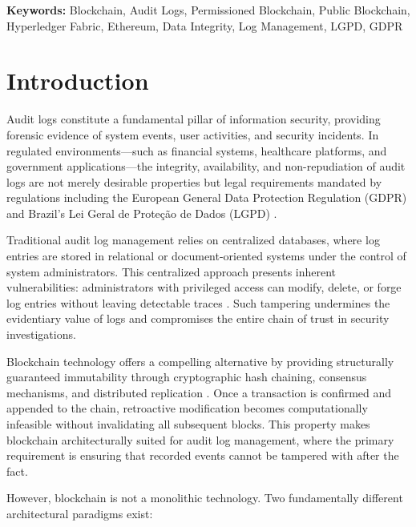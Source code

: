 \documentclass[12pt,a4paper]{article}
\begin{document}
\noindent\textbf{Keywords:} Blockchain, Audit Logs, Permissioned Blockchain, Public Blockchain, Hyperledger Fabric, Ethereum, Data Integrity, Log Management, LGPD, GDPR

\section{Introduction}
\label{sec:introduction}

Audit logs constitute a fundamental pillar of information security, providing forensic evidence of system events, user activities, and security incidents. In regulated environments---such as financial systems, healthcare platforms, and government applications---the integrity, availability, and non-repudiation of audit logs are not merely desirable properties but legal requirements mandated by regulations including the European General Data Protection Regulation (GDPR) \cite{gdpr2016} and Brazil's Lei Geral de Proteção de Dados (LGPD) \cite{brasil2018}.

Traditional audit log management relies on centralized databases, where log entries are stored in relational or document-oriented systems under the control of system administrators. This centralized approach presents inherent vulnerabilities: administrators with privileged access can modify, delete, or forge log entries without leaving detectable traces \cite{nist2020}. Such tampering undermines the evidentiary value of logs and compromises the entire chain of trust in security investigations.

Blockchain technology offers a compelling alternative by providing structurally guaranteed immutability through cryptographic hash chaining, consensus mechanisms, and distributed replication \cite{nakamoto2008}. Once a transaction is confirmed and appended to the chain, retroactive modification becomes computationally infeasible without invalidating all subsequent blocks. This property makes blockchain architecturally suited for audit log management, where the primary requirement is ensuring that recorded events cannot be tampered with after the fact.

However, blockchain is not a monolithic technology. Two fundamentally different architectural paradigms exist:
\end{document}

